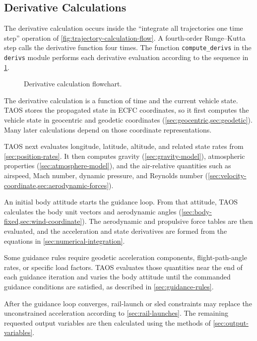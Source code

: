 \subsection{Derivative Calculations}\label{sec:derivative-calculations}

The derivative calculation occurs inside the ``integrate all trajectories one time
step'' operation of \cref{fig:trajectory-calculation-flow}. A fourth-order
Runge--Kutta step calls the derivative function four times. The function
\texttt{compute\_derivs} in the \texttt{derivs} module performs each derivative
evaluation according to the sequence in
\cref{fig:derivative-calculation-flow}.

\begin{figure}[htbp]
  \centering
  
  \caption{Derivative calculation flowchart.}
  \label{fig:derivative-calculation-flow}
\end{figure}

The derivative calculation is a function of time and the current vehicle state. TAOS
stores the propagated state in ECFC coordinates, so it first computes the vehicle
state in geocentric and geodetic coordinates
(\cref{sec:geocentric,sec:geodetic}). Many later calculations depend on those
coordinate representations.

TAOS next evaluates longitude, latitude, altitude, and related state rates from
\cref{sec:position-rates}. It then computes gravity
(\cref{sec:gravity-model}), atmospheric properties
(\cref{sec:atmosphere-model}), and the air-relative quantities such as airspeed,
Mach number, dynamic pressure, and Reynolds number
(\cref{sec:velocity-coordinate,sec:aerodynamic-forces}).

An initial body attitude starts the guidance loop. From that attitude, TAOS calculates
the body unit vectors and aerodynamic angles
(\cref{sec:body-fixed,sec:wind-coordinate}). The aerodynamic and propulsive
force tables are then evaluated, and the acceleration and state derivatives are formed
from the equations in \cref{sec:numerical-integration}.

Some guidance rules require geodetic acceleration components, flight-path-angle
rates, or specific load factors. TAOS evaluates those quantities near the end of each
guidance iteration and varies the body attitude until the commanded guidance
conditions are satisfied, as described in \cref{sec:guidance-rules}.

After the guidance loop converges, rail-launch or sled constraints may replace the
unconstrained acceleration according to \cref{sec:rail-launches}. The remaining
requested output variables are then calculated using the methods of
\cref{sec:output-variables}.
